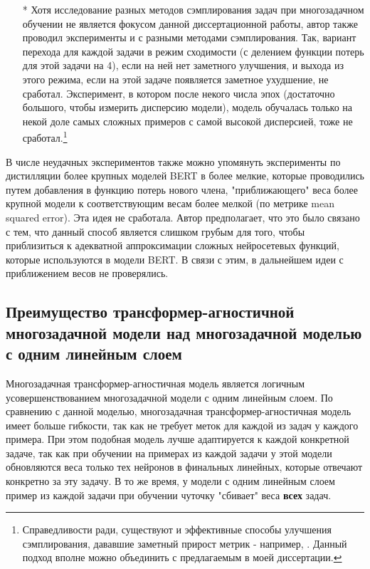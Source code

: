 \begin{itemize}
\item[*] Хотя исследование разных методов сэмплирования задач при многозадачном обучении не является фокусом данной диссертационной работы, автор также проводил эксперименты и с разными методами сэмплирования. Так, вариант перехода для каждой задачи в режим сходимости (с делением функции потерь для этой задачи на 4), если на ней нет заметного улучшения, и выхода из этого режима, если на этой задаче появляется заметное ухудшение, не сработал. Эксперимент, в котором после некого числа эпох (достаточно большого, чтобы измерить дисперсию модели), модель обучалась только на некой доле самых сложных примеров с самой высокой дисперсией, тоже не сработал.\footnote{Справедливости ради, существуют и эффективные способы улучшения сэмплирования, дававшие заметный прирост метрик - например, \cite{GradTS}. Данный подход вполне можно объединить с предлагаемым в моей диссертации.}
\end{itemize}

В числе неудачных экспериментов также можно упомянуть эксперименты по дистилляции более крупных моделей BERT в более мелкие, которые проводились путем добавления в функцию потерь нового члена, "приближающего" веса более крупной модели к соответствующим весам более мелкой (по метрике mean squared error). Эта идея не сработала. Автор предполагает, что это было связано с тем, что данный способ является слишком грубым для того, чтобы приблизиться к адекватной аппроксимации сложных нейросетевых функций, которые используются в модели BERT. В связи с этим, в дальнейшем идеи с приближением весов не проверялись. 
\subsection{Преимущество трансформер-агностичной многозадачной модели над многозадачной моделью с одним линейным слоем} 
\label{ch:tr-ag:advantages}

Многозадачная трансформер-агностичная модель является логичным усовершенствованием многозадачной модели с одним линейным слоем. По сравнению с данной моделью, многозадачная трансформер-агностичная модель имеет больше гибкости, так как не требует меток для каждой из задач у каждого примера. При этом подобная модель лучше адаптируется к каждой конкретной задаче, так как при обучении на примерах из каждой задачи у этой модели обновляются веса только тех нейронов в финальных линейных, которые отвечают конкретно за эту задачу. В то же время, у модели с одним линейным слоем пример из каждой задачи при обучении чуточку "сбивает" веса \textbf{всех} задач. 

